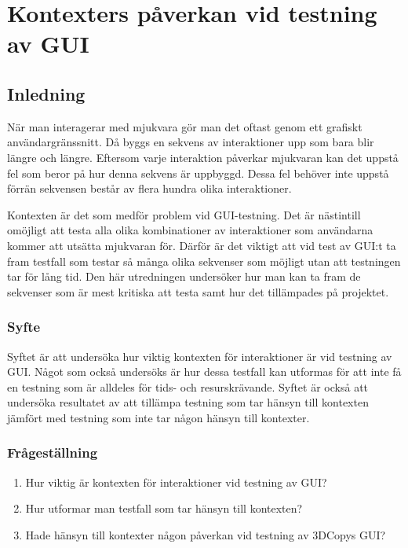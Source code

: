 \chapter{Kontexters påverkan vid testning av GUI}
\label{cha:indiv-report-holmberg}

\section{Inledning}
\label{sec:introduction-holmberg}

När man interagerar med mjukvara gör man det oftast genom ett grafiskt användargräns\-snitt. Då byggs en sekvens av interaktioner upp som bara blir längre och längre. Eftersom varje interaktion påverkar mjukvaran kan det uppstå fel som beror på hur denna sekvens är uppbyggd. Dessa fel behöver inte uppstå förrän sekvensen består av flera hundra olika interaktioner.

Kontexten är det som medför problem vid GUI-testning. Det är nästintill omöjligt att testa alla olika kombinationer av interaktioner som användarna kommer att utsätta mjukvaran för. Därför är det viktigt att vid test av GUI:t ta fram testfall som testar så många olika sekvenser som möjligt utan att testningen tar för lång tid. Den här utredningen undersöker hur man kan ta fram de sekvenser som är mest kritiska att testa samt hur det tillämpades på projektet.

\subsection{Syfte}
\label{sec:purpose-holmberg}

Syftet är att undersöka hur viktig kontexten för interaktioner är vid testning av GUI. Något som också undersöks är hur dessa testfall kan utformas för att inte få en testning som är alldeles för tids- och resurskrävande. Syftet är också att undersöka resultatet av att tillämpa testning som tar hänsyn till kontexten jämfört med testning som inte tar någon hänsyn till kontexter.

\subsection{Frågeställning}
\label{sec:issue-holmberg}

\begin{enumerate}
	\item Hur viktig är kontexten för interaktioner vid testning av GUI?
	\item Hur utformar man testfall som tar hänsyn till kontexten?
	\item Hade hänsyn till kontexter någon påverkan vid testning av 3DCopys GUI?
\end{enumerate}

